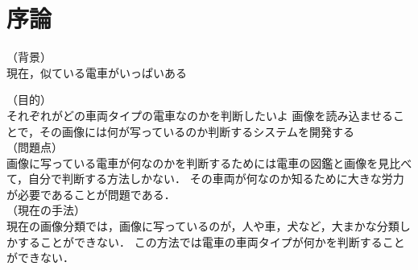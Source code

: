 

\chapter{序論}


（背景）\\
現在，似ている電車がいっぱいある

（目的）\\
それぞれがどの車両タイプの電車なのかを判断したいよ
画像を読み込ませることで，その画像には何が写っているのか判断するシステムを開発する\\
（問題点）\\
画像に写っている電車が何なのかを判断するためには電車の図鑑と画像を見比べて，自分で判断する方法しかない．
その車両が何なのか知るために大きな労力が必要であることが問題である．\\
（現在の手法）\\
現在の画像分類では，画像に写っているのが，人や車，犬など，大まかな分類しかすることができない．
この方法では電車の車両タイプが何かを判断することができない．\\